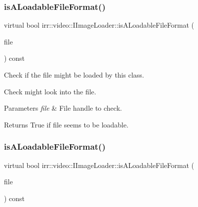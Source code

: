 \subsubsection{\texorpdfstring{is\+A\+Loadable\+File\+Format()}{isALoadableFileFormat()}\hspace{0.1cm}{\footnotesize\ttfamily [1/2]}}
{\footnotesize\ttfamily virtual bool irr\+::video\+::\+I\+Image\+Loader\+::is\+A\+Loadable\+File\+Format (\begin{DoxyParamCaption}\item[{\hyperlink{classirr_1_1io_1_1IReadFile}{io\+::\+I\+Read\+File} $\ast$}]{file }\end{DoxyParamCaption}) const\hspace{0.3cm}{\ttfamily [pure virtual]}}



Check if the file might be loaded by this class. 

Check might look into the file. 
\begin{DoxyParams}{Parameters}
{\em file} & File handle to check. \\
\hline
\end{DoxyParams}
\begin{DoxyReturn}{Returns}
True if file seems to be loadable. 
\end{DoxyReturn}
\mbox{\label{classirr_1_1video_1_1IImageLoader_aeb87ae825dfdb747e826b1e001a5f5cc}} 
\subsubsection{\texorpdfstring{is\+A\+Loadable\+File\+Format()}{isALoadableFileFormat()}\hspace{0.1cm}{\footnotesize\ttfamily [2/2]}}
{\footnotesize\ttfamily virtual bool irr\+::video\+::\+I\+Image\+Loader\+::is\+A\+Loadable\+File\+Format (\begin{DoxyParamCaption}\item[{\hyperlink{classirr_1_1io_1_1IReadFile}{io\+::\+I\+Read\+File} $\ast$}]{file }\end{DoxyParamCaption}) const\hspace{0.3cm}{\ttfamily [pure virtual]}}



